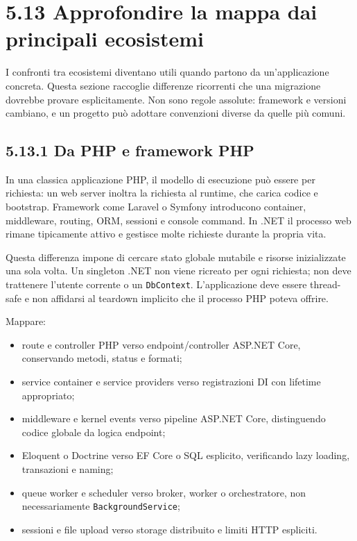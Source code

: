 \documentclass[
  italian,
  10pt,
]{book}
\providecommand{\tightlist}{%
  \setlength{\itemsep}{0pt}\setlength{\parskip}{0pt}}
\begin{document}
\section{5.13 Approfondire la mappa dai principali
ecosistemi}\label{approfondire-la-mappa-dai-principali-ecosistemi}

I confronti tra ecosistemi diventano utili quando partono da
un'applicazione concreta. Questa sezione raccoglie differenze ricorrenti
che una migrazione dovrebbe provare esplicitamente. Non sono regole
assolute: framework e versioni cambiano, e un progetto può adottare
convenzioni diverse da quelle più comuni.

\subsection{5.13.1 Da PHP e framework PHP}\label{da-php-e-framework-php}

In una classica applicazione PHP, il modello di esecuzione può essere
per richiesta: un web server inoltra la richiesta al runtime, che carica
codice e bootstrap. Framework come Laravel o Symfony introducono
container, middleware, routing, ORM, sessioni e console command. In .NET
il processo web rimane tipicamente attivo e gestisce molte richieste
durante la propria vita.

Questa differenza impone di cercare stato globale mutabile e risorse
inizializzate una sola volta. Un singleton .NET non viene ricreato per
ogni richiesta; non deve trattenere l'utente corrente o un
\texttt{DbContext}. L'applicazione deve essere thread-safe e non
affidarsi al teardown implicito che il processo PHP poteva offrire.

Mappare:

\begin{itemize}
\tightlist
\item
  route e controller PHP verso endpoint/controller ASP.NET Core,
  conservando metodi, status e formati;
\item
  service container e service providers verso registrazioni DI con
  lifetime appropriato;
\item
  middleware e kernel events verso pipeline ASP.NET Core, distinguendo
  codice globale da logica endpoint;
\item
  Eloquent o Doctrine verso EF Core o SQL esplicito, verificando lazy
  loading, transazioni e naming;
\item
  queue worker e scheduler verso broker, worker o orchestratore, non
  necessariamente \texttt{BackgroundService};
\item
  sessioni e file upload verso storage distribuito e limiti HTTP
  espliciti.
\end{itemize}
\end{document}

